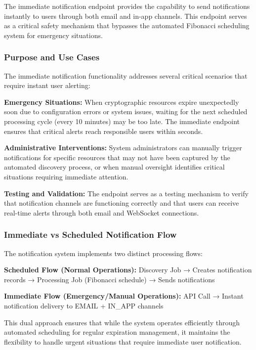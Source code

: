 The immediate notification endpoint provides the capability to send notifications instantly to users through both email and in-app channels. This endpoint serves as a critical safety mechanism that bypasses the automated Fibonacci scheduling system for emergency situations.

\subsubsection{Purpose and Use Cases}

The immediate notification functionality addresses several critical scenarios that require instant user alerting:

\noindent
\textbf{Emergency Situations:} When cryptographic resources expire unexpectedly soon due to configuration errors or system issues, waiting for the next scheduled processing cycle (every 10 minutes) may be too late. The immediate endpoint ensures that critical alerts reach responsible users within seconds.

\noindent
\textbf{Administrative Interventions:} System administrators can manually trigger notifications for specific resources that may not have been captured by the automated discovery process, or when manual oversight identifies critical situations requiring immediate attention.

\noindent
\textbf{Testing and Validation:} The endpoint serves as a testing mechanism to verify that notification channels are functioning correctly and that users can receive real-time alerts through both email and WebSocket connections.

\subsubsection{Immediate vs Scheduled Notification Flow}

The notification system implements two distinct processing flows:

\noindent
\textbf{Scheduled Flow (Normal Operations):}
Discovery Job → Creates notification records → Processing Job (Fibonacci schedule) → Sends notifications

\noindent
\textbf{Immediate Flow (Emergency/Manual Operations):}
API Call → Instant notification delivery to EMAIL + IN\_APP channels

This dual approach ensures that while the system operates efficiently through automated scheduling for regular expiration management, it maintains the flexibility to handle urgent situations that require immediate user notification.

